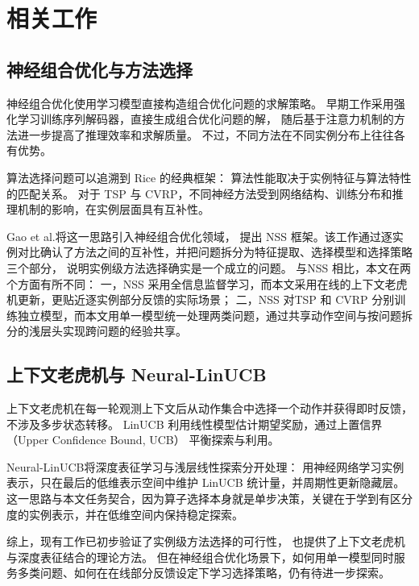 
\section{相关工作}
\label{sec:related}

\subsection{神经组合优化与方法选择}

神经组合优化使用学习模型直接构造组合优化问题的求解策略。
早期工作采用强化学习训练序列解码器，直接生成组合优化问题的解\cite{bello2016nco}，
随后基于注意力机制的方法进一步提高了推理效率和求解质量\cite{kool2019attention}。
不过，不同方法在不同实例分布上往往各有优势。

算法选择问题可以追溯到 Rice 的经典框架：
算法性能取决于实例特征与算法特性的匹配关系\cite{rice1976algorithmselection}。
对于 TSP 与 CVRP，不同神经方法受到网络结构、训练分布和推理机制的影响，在实例层面具有互补性。

Gao et al.\cite{gao2025nss}将这一思路引入神经组合优化领域，
提出 NSS 框架。该工作通过逐实例对比确认了方法之间的互补性，并把问题拆分为特征提取、选择模型和选择策略三个部分，
说明实例级方法选择确实是一个成立的问题。
与NSS 相比，本文在两个方面有所不同：
一，NSS 采用全信息监督学习，而本文采用在线的上下文老虎机更新，更贴近逐实例部分反馈的实际场景；
二，NSS 对TSP 和 CVRP 分别训练独立模型，而本文用单一模型统一处理两类问题，通过共享动作空间与按问题拆分的浅层头实现跨问题的经验共享。

\subsection{上下文老虎机与 Neural-LinUCB}

上下文老虎机在每一轮观测上下文后从动作集合中选择一个动作并获得即时反馈，不涉及多步状态转移。
LinUCB 利用线性模型估计期望奖励，通过上置信界（Upper Confidence Bound, UCB）
平衡探索与利用\cite{auer2002ucb1,li2010linucb}。

Neural-LinUCB\cite{xu2022neurallinucb}将深度表征学习与浅层线性探索分开处理：
用神经网络学习实例表示，只在最后的低维表示空间中维护 LinUCB 统计量，并周期性更新隐藏层。
这一思路与本文任务契合，因为算子选择本身就是单步决策，关键在于学到有区分度的实例表示，并在低维空间内保持稳定探索。

综上，现有工作已初步验证了实例级方法选择的可行性，
也提供了上下文老虎机与深度表征结合的理论方法。
但在神经组合优化场景下，如何用单一模型同时服务多类问题、如何在在线部分反馈设定下学习选择策略，仍有待进一步探索。
